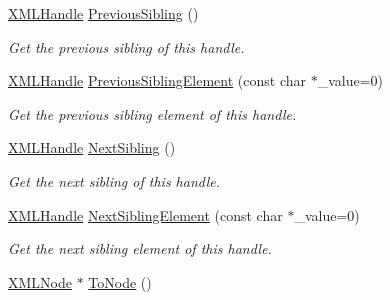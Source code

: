 \begin{DoxyCompactItemize}
\mbox{\label{classtinyxml2_1_1XMLHandle_a428374e756f4db4cbc287fec64eae02c}} 
\hyperlink{classtinyxml2_1_1XMLHandle}{X\+M\+L\+Handle} \hyperlink{classtinyxml2_1_1XMLHandle_a428374e756f4db4cbc287fec64eae02c}{Previous\+Sibling} ()
\begin{DoxyCompactList}\small\item\em Get the previous sibling of this handle. \end{DoxyCompactList}\item 
\mbox{\label{classtinyxml2_1_1XMLHandle_a31a0d5d060292bec5df2b2efe2eca228}} 
\hyperlink{classtinyxml2_1_1XMLHandle}{X\+M\+L\+Handle} \hyperlink{classtinyxml2_1_1XMLHandle_a31a0d5d060292bec5df2b2efe2eca228}{Previous\+Sibling\+Element} (const char $\ast$\+\_\+value=0)
\begin{DoxyCompactList}\small\item\em Get the previous sibling element of this handle. \end{DoxyCompactList}\item 
\mbox{\label{classtinyxml2_1_1XMLHandle_aad2eccc7c7c7b18145877c978c3850b5}} 
\hyperlink{classtinyxml2_1_1XMLHandle}{X\+M\+L\+Handle} \hyperlink{classtinyxml2_1_1XMLHandle_aad2eccc7c7c7b18145877c978c3850b5}{Next\+Sibling} ()
\begin{DoxyCompactList}\small\item\em Get the next sibling of this handle. \end{DoxyCompactList}\item 
\mbox{\label{classtinyxml2_1_1XMLHandle_a447c9b284cfcd5518f9e320ba14b9c46}} 
\hyperlink{classtinyxml2_1_1XMLHandle}{X\+M\+L\+Handle} \hyperlink{classtinyxml2_1_1XMLHandle_a447c9b284cfcd5518f9e320ba14b9c46}{Next\+Sibling\+Element} (const char $\ast$\+\_\+value=0)
\begin{DoxyCompactList}\small\item\em Get the next sibling element of this handle. \end{DoxyCompactList}\item 
\mbox{\label{classtinyxml2_1_1XMLHandle_a03ea6ec970a021b71bf1219a0f6717df}} 
\hyperlink{classtinyxml2_1_1XMLNode}{X\+M\+L\+Node} $\ast$ \hyperlink{classtinyxml2_1_1XMLHandle_a03ea6ec970a021b71bf1219a0f6717df}{To\+Node} ()

\end{DoxyCompactItemize}
